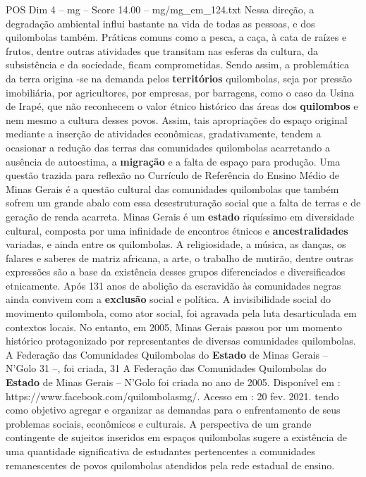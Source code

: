 \begin{textsample}{POS Dim 4 – mg – Score 14.00 – mg/mg\_em\_124.txt}
Nessa direção, a degradação ambiental influi bastante na vida de todas as pessoas, e dos quilombolas também.
Práticas comuns como a pesca, a caça, à cata de raízes e frutos, dentre outras atividades que transitam nas esferas da cultura, da subsistência e da sociedade, ficam comprometidas.
Sendo assim, a problemática da terra origina -se na demanda pelos \textbf{territórios} quilombolas, seja por pressão imobiliária, por agricultores, por empresas, por barragens, como o caso da Usina de Irapé, que não reconhecem o valor étnico histórico das áreas dos \textbf{quilombos} e nem mesmo a cultura desses povos.
Assim, tais apropriações do espaço original mediante a inserção de atividades econômicas, gradativamente, tendem a ocasionar a redução das terras das comunidades quilombolas acarretando a ausência de autoestima, a \textbf{migração} e a falta de espaço para produção.
Uma questão trazida para reflexão no Currículo de Referência do Ensino Médio de Minas Gerais é a questão cultural das comunidades quilombolas que também sofrem um grande abalo com essa desestruturação social que a falta de terras e de geração de renda acarreta.
Minas Gerais é um \textbf{estado} riquíssimo em diversidade cultural, composta por uma infinidade de encontros étnicos e \textbf{ancestralidades} variadas, e ainda entre os quilombolas.
A religiosidade, a música, as danças, os falares e saberes de matriz africana, a arte, o trabalho de mutirão, dentre outras expressões são a base da existência desses grupos diferenciados e diversificados etnicamente.
Após 131 anos de abolição da escravidão às comunidades negras ainda convivem com a \textbf{exclusão} social e política.
A invisibilidade social do movimento quilombola, como ator social, foi agravada pela luta desarticulada em contextos locais.
No entanto, em 2005, Minas Gerais passou por um momento histórico protagonizado por representantes de diversas comunidades quilombolas.
A Federação das Comunidades Quilombolas do \textbf{Estado} de Minas Gerais – N’Golo 31 –, foi criada, 31 A Federação das Comunidades Quilombolas do \textbf{Estado} de Minas Gerais – N’Golo foi criada no ano de 2005.
Disponível em : https://www.facebook.com/quilombolasmg/.
Acesso em : 20 fev. 2021. tendo como objetivo agregar e organizar as demandas para o enfrentamento de seus problemas sociais, econômicos e culturais.
A perspectiva de um grande contingente de sujeitos inseridos em espaços quilombolas sugere a existência de uma quantidade significativa de estudantes pertencentes a comunidades remanescentes de povos quilombolas atendidos pela rede estadual de ensino.

\end{textsample}
